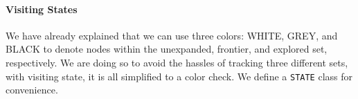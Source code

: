 \documentclass[../main.tex]{subfiles}
\begin{document}
\paragraph{Visiting States} 
We have already explained that we can use three colors: WHITE, GREY, and BLACK to denote nodes within the unexpanded, frontier, and explored set, respectively. We are doing so to avoid the hassles of tracking three different sets, with visiting state, it is all simplified to a color check. We define a \texttt{STATE} class for convenience.
\end{document}
